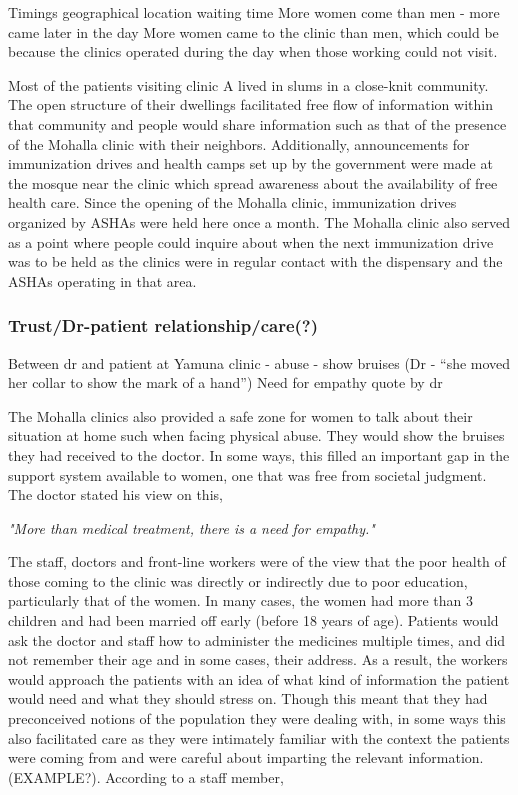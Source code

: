 Timings
geographical location
waiting time
	More women come than men - more came later in the day
More women came to the clinic than men, which could be because the clinics operated during the day when those working could not visit.

Most of the patients visiting clinic A lived in slums in a close-knit community. The open structure of their dwellings facilitated free flow of information within that community and people would share information such as that of the presence of the Mohalla clinic with their neighbors. Additionally, announcements for immunization drives and health camps set up by the government were made at the mosque near the clinic which spread awareness about the availability of free health care. Since the opening of the Mohalla clinic, immunization drives organized by ASHAs were held here once a month. The Mohalla clinic also served as a point where people could inquire about when the next immunization drive was to be held as the clinics were in regular contact with the dispensary and the ASHAs operating in that area.

\subsubsection{Trust/Dr-patient relationship/care(?)}
Between dr and patient at Yamuna clinic - abuse - show bruises (Dr - “she moved her collar to show the mark of a hand”) 
Need for empathy quote by dr

The Mohalla clinics also provided a safe zone for women to talk about their situation at home such when facing physical abuse. They would show the bruises they had received to the doctor. In some ways, this filled an important gap in the support system available to women, one that was free from societal judgment. The doctor stated his view on this, 

\textit{"More than medical treatment, there is a need for empathy."}

The staff, doctors and front-line workers were of the view that the poor health of those coming to the clinic was directly or indirectly due to poor education, particularly that of the women. In many cases, the women had more than 3 children and had been married off early (before 18 years of age). Patients would ask the doctor and staff how to administer the medicines multiple times, and did not remember their age and in some cases, their address. As a result, the workers would approach the patients with an idea of what kind of information the patient would need and what they should stress on. Though this meant that they had preconceived notions of the population they were dealing with, in some ways this also facilitated care as they were intimately familiar with the context the patients were coming from and were careful about imparting the relevant information. (EXAMPLE?). According to a staff member,

